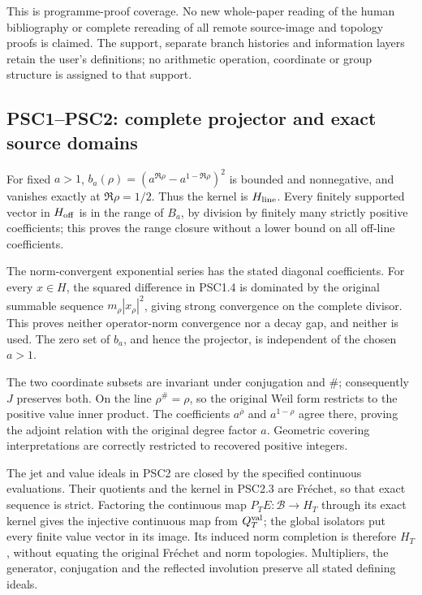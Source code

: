 This is programme-proof coverage. No new whole-paper reading of the
human bibliography or complete rereading of all remote source-image and
topology proofs is claimed. The support, separate branch histories and
information layers retain the user's definitions; no arithmetic
operation, coordinate or group structure is assigned to that support.

\subsection{PSC1--PSC2: complete projector and exact source
domains}\label{psc1psc2-complete-projector-and-exact-source-domains}

For fixed \(a>1\), \(b_a(\rho)=(a^{\Re\rho}-a^{1-\Re\rho})^2\) is
bounded and nonnegative, and vanishes exactly at \(\Re\rho=1/2\). Thus
the kernel is \(H_{\rm line}\). Every finitely supported vector in
\(H_{\rm off}\) is in the range of \(B_a\), by division by finitely many
strictly positive coefficients; this proves the range closure without a
lower bound on all off-line coefficients.

The norm-convergent exponential series has the stated diagonal
coefficients. For every \(x\in H\), the squared difference in PSC1.4 is
dominated by the original summable sequence \(m_\rho|x_\rho|^2\), giving
strong convergence on the complete divisor. This proves neither
operator-norm convergence nor a decay gap, and neither is used. The zero
set of \(b_a\), and hence the projector, is independent of the chosen
\(a>1\).

The two coordinate subsets are invariant under conjugation and \(\#\);
consequently \(J\) preserves both. On the line \(\rho^\#=\rho\), so the
original Weil form restricts to the positive value inner product. The
coefficients \(a^{\overline\rho}\) and \(a^{1-\rho}\) agree there,
proving the adjoint relation with the original degree factor \(a\).
Geometric covering interpretations are correctly restricted to recovered
positive integers.

The jet and value ideals in PSC2 are closed by the specified continuous
evaluations. Their quotients and the kernel in PSC2.3 are Fréchet, so
that exact sequence is strict. Factoring the continuous map
\(P_TE:\mathcal B\to H_T\) through its exact kernel gives the injective
continuous map from \(Q_T^{\rm val}\); the global isolators put every
finite value vector in its image. Its induced norm completion is
therefore \(H_T\), without equating the original Fréchet and norm
topologies. Multipliers, the generator, conjugation and the reflected
involution preserve all stated defining ideals.

